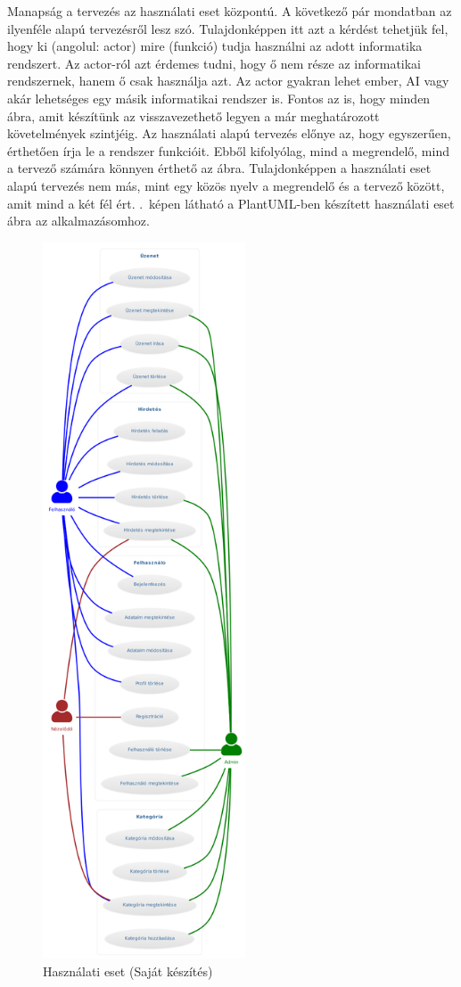 \documentclass[]{thesis-ekf}
\theoremstyle{definition}
\theoremstyle{remark}
\begin{document}
	Manapság a tervezés az használati eset központú. A következő pár mondatban az ilyenféle alapú tervezésről lesz szó. Tulajdonképpen itt azt a kérdést tehetjük fel, hogy ki (angolul: actor) mire (funkció) tudja használni az adott informatika rendszert. Az actor-ról azt érdemes tudni, hogy ő nem része az informatikai rendszernek, hanem ő csak használja azt. Az actor gyakran lehet ember, AI vagy akár lehetséges egy másik informatikai rendszer is. Fontos az is, hogy minden ábra, amit készítünk az visszavezethető legyen a már meghatározott követelmények szintjéig. Az használati alapú tervezés előnye az, hogy egyszerűen, érthetően írja le a rendszer funkcióit. Ebből kifolyólag, mind a megrendelő, mind a tervező számára könnyen érthető az ábra. Tulajdonképpen a használati eset alapú tervezés nem más, mint egy közös nyelv a megrendelő és a tervező között, amit mind a két fél ért.\cite{Kusper Informatikai} .~képen látható a PlantUML-ben készített használati eset ábra az alkalmazásomhoz.
	\begin{figure}[ht!]
		\centering
		\includegraphics[width=6cm]{./tervezes/useCase}
		\caption{Használati eset (Saját készítés)} 
		\label{useCase}
	\end{figure}
\end{document}
